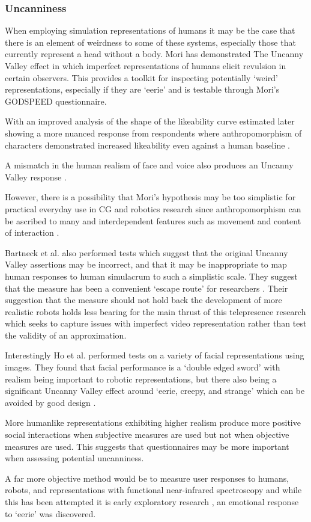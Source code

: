 \subsubsection{Uncanniness}		
When employing simulation representations of humans it may be the case that there is an element of weirdness to some of these systems, especially those that currently represent a head without a body. Mori has demonstrated The Uncanny Valley \cite{Mori1970} effect in which imperfect representations of humans elicit revulsion in certain observers. This provides a toolkit for inspecting potentially `weird' representations, especially if they are `eerie' and is testable through Mori's GODSPEED questionnaire. \par
With an improved analysis of the shape of the likeability curve estimated later showing a more nuanced response from respondents where anthropomorphism of characters demonstrated increased likeability even against a human baseline \cite{Bartneck2007, Bartneck2009}.\par
A mismatch in the human realism of face and voice also produces an Uncanny Valley response \cite{Mitchell2011}.\par
However, there is a possibility that Mori's hypothesis may be too simplistic for practical everyday use in CG and robotics research since anthropomorphism can be ascribed to many and interdependent features such as movement and content of interaction \cite{Bartneck2009}.\par
Bartneck et al. also performed tests which suggest that the original Uncanny Valley assertions may be incorrect, and that it may be inappropriate to map human responses to human simulacrum to such a simplistic scale. They suggest that the measure has been a convenient `escape route' for researchers \cite{Bartneck2009}. Their suggestion that the measure should not hold back the development of more realistic robots holds less bearing for the main thrust of this telepresence research which seeks to capture issues with imperfect video representation rather than test the validity of an approximation.\par
Interestingly Ho et al. performed tests on a variety of facial representations using images.  They found that facial performance is a `double edged sword' with realism being important to robotic representations, but there also being a significant Uncanny Valley effect around `eerie, creepy, and strange' which can be avoided by good design \cite{Ho2008}.\par
More humanlike representations exhibiting higher realism produce more positive social interactions when subjective measures are used \cite{Yee2007} but not when objective measures are used. This suggests that questionnaires may be more important when assessing potential uncanniness.\par
A far more objective method would be to measure user responses to humans, robots, and representations with functional near-infrared spectroscopy and while this has been attempted it is early exploratory research \cite{Strait2014}, an emotional response to `eerie' was discovered.
